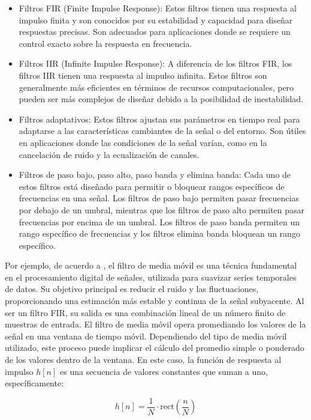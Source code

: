 \documentclass[]{book}
\begin{document}
\begin{itemize}
    \item Filtros FIR (Finite Impulse Response): Estos filtros tienen una respuesta al impulso finita y son conocidos por su estabilidad y capacidad para diseñar respuestas precisas. Son adecuados para aplicaciones donde se requiere un control exacto sobre la respuesta en frecuencia.
    \item Filtros IIR (Infinite Impulse Response): A diferencia de los filtros FIR, los filtros IIR tienen una respuesta al impulso infinita. Estos filtros son generalmente más eficientes en términos de recursos computacionales, pero pueden ser más complejos de diseñar debido a la posibilidad de inestabilidad.
    \item Filtros adaptativos: Estos filtros ajustan sus parámetros en tiempo real para adaptarse a las características cambiantes de la señal o del entorno. Son útiles en aplicaciones donde las condiciones de la señal varían, como en la cancelación de ruido y la ecualización de canales.
    \item  Filtros de paso bajo, paso alto, paso banda y elimina banda: Cada uno de estos filtros está diseñado para permitir o bloquear rangos específicos de frecuencias en una señal. Los filtros de paso bajo permiten pasar frecuencias por debajo de un umbral, mientras que los filtros de paso alto permiten pasar frecuencias por encima de un umbral. Los filtros de paso banda permiten un rango específico de frecuencias y los filtros elimina banda bloquean un rango específico.
\end{itemize}

\noindent Por ejemplo, de acuerdo a \cite{proakis2007digital}, el filtro de media móvil es una técnica fundamental en el procesamiento digital de señales, utilizada para suavizar series temporales de datos. Su objetivo principal es reducir el ruido y las fluctuaciones, proporcionando una estimación más estable y continua de la señal subyacente. Al ser un filtro FIR, su salida es una combinación lineal de un número finito de muestras de entrada. El filtro de media móvil opera promediando los valores de la señal en una ventana de tiempo móvil. Dependiendo del tipo de media móvil utilizado, este proceso puede implicar el cálculo del promedio simple o ponderado de los valores dentro de la ventana. En este caso, la función de respuesta al impulso \( h[n] \) es una secuencia de valores constantes que suman a uno, específicamente:

\begin{equation}
    h[n] = \frac{1}{N} \cdot \text{rect}\left(\frac{n}{N}\right)
\end{equation}
\end{document}
